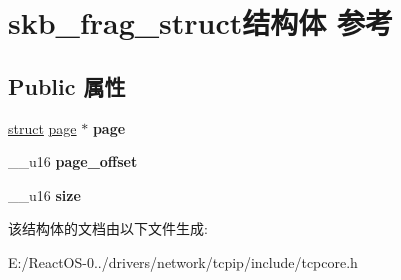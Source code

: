 \hypertarget{structskb__frag__struct}{}\section{skb\+\_\+frag\+\_\+struct结构体 参考}
\label{structskb__frag__struct}
\subsection*{Public 属性}
\begin{DoxyCompactItemize}
\item 
\mbox{\label{structskb__frag__struct_ac628674d6259849a4a23c3679ec42b92}} 
\hyperlink{interfacestruct}{struct} \hyperlink{structpage}{page} $\ast$ {\bfseries page}
\item 
\mbox{\label{structskb__frag__struct_a8b1e7e46c424506376a88216b6e41ee8}} 
\+\_\+\+\_\+u16 {\bfseries page\+\_\+offset}
\item 
\mbox{\label{structskb__frag__struct_a1e90fecd07d253a1f3804e83be8e17e7}} 
\+\_\+\+\_\+u16 {\bfseries size}
\end{DoxyCompactItemize}


该结构体的文档由以下文件生成\+:\begin{DoxyCompactItemize}
\item 
E\+:/\+React\+O\+S-\/0../drivers/network/tcpip/include/tcpcore.\+h\end{DoxyCompactItemize}
